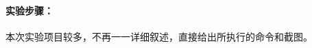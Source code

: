 \documentclass[cs4size,a4paper,nofonts]{ctexart}
\begin{document}
\paragraph{实验步骤：}\quad

\newcommand{\image}[3][height=9cm]{%
    \centering
    \texttt{[image: images/exp3/\#2.png]}
    \caption{#3}
    \label{fig:#3}
}

\newcommand{\subimage}[2][height=10cm]{
    \centering
    \subfigure[]{
        \texttt{[image: images/exp3/\#2.png]}
    }
}

\newcommand{\subimagetwo}[1]{\subfigure[]{
        \texttt{[image: images/exp3/\#1.png]}
    }}
\newcommand{\subimagethree}[1]{\subfigure[]{
        \texttt{[image: images/exp3/\#1.png]}
    }}

本次实验项目较多，不再一一详细叙述，直接给出所执行的命令和截图。

\vspace*{1em}
\end{document}
